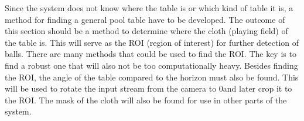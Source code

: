 Since the system does not know where the table is or which kind of table it is, a method for finding a general pool table have to be developed. The outcome of this section should be a method to determine where the cloth (playing field) of the table is. This will serve as the ROI (region of interest) for further detection of balls. There are many methods that could be used to find the ROI. The key is to find a robust one that will also not be too computationally heavy. Besides finding the ROI, the angle of the table compared to the horizon must also be found. This will be used to rotate the input stream from the camera to 0\degree and later crop it to the ROI. The mask of the cloth will also be found for use in other parts of the system.\\

